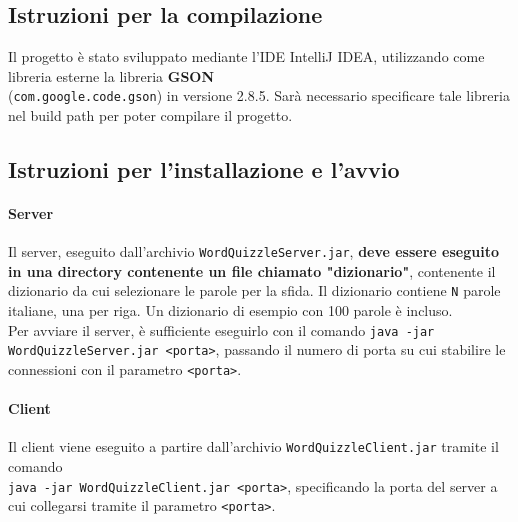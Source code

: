 \documentclass[10pt]{article}
\begin{document}
{\subsection{Istruzioni per la compilazione}
Il progetto è stato sviluppato mediante l'IDE IntelliJ IDEA, utilizzando come libreria esterne la libreria \textbf{GSON}\\(\texttt{com.google.code.gson}) in versione 2.8.5. Sarà necessario specificare tale libreria nel build path per poter compilare il progetto.
\subsection{Istruzioni per l'installazione e l'avvio}
\paragraph{Server} Il server, eseguito dall'archivio \texttt{WordQuizzleServer.jar}, \textbf{deve essere eseguito in una directory contenente un file chiamato "dizionario"}, contenente il dizionario da cui selezionare le parole per la sfida. Il dizionario contiene \texttt{N} parole italiane, una per riga. Un dizionario di esempio con 100 parole è incluso.\\
Per avviare il server, è sufficiente eseguirlo con il comando \texttt{java -jar WordQuizzleServer.jar <porta>}, passando il numero di porta su cui stabilire le connessioni con il parametro \texttt{<porta>}.
\paragraph{Client} Il client viene eseguito a partire dall'archivio \texttt{WordQuizzleClient.jar} tramite il comando\\\texttt{java -jar WordQuizzleClient.jar <porta>}, specificando la porta del server a cui collegarsi tramite il parametro \texttt{<porta>}.
\pagebreak
}
\end{document}
